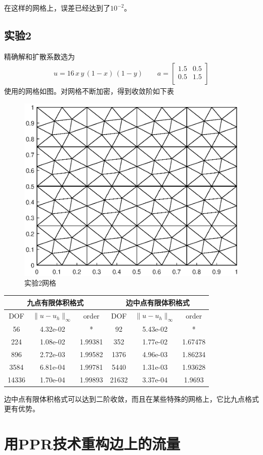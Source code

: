 \documentclass[12pt,a4paper]{article}
\theoremstyle{plain}
\begin{document}
在这样的网格上，误差已经达到了$10^{-2}$。

\subsection*{实验2}

精确解和扩散系数选为
\begin{align*}
u = 16 \, x \, y \, (1-x) \, (1-y) \qquad
a = \left[
\begin{matrix}
1.5 & 0.5 \\
0.5 & 1.5 \\
\end{matrix}
\right]
\end{align*}
使用的网格如图。对网格不断加密，得到收敛阶如下表
\begin{figure}[H]
\centering
\includegraphics[width=0.4\linewidth]{mesh2}
\caption{实验2网格}
\end{figure}

\begin{table}
\centering
\begin{tabular}{ccc|ccc}
\multicolumn{3}{c}{九点有限体积格式}  & \multicolumn{3}{c}{边中点有限体积格式} \\
\hline
DOF & $\|u - u_h\|_{\infty}$ & order & DOF & $\|u - u_h\|_{\infty}$ & order \\
\hline
56 & 4.32e-02 & * & 92 & 5.43e-02 & * \\
224 & 1.08e-02 & 1.99381 & 352 & 1.77e-02 & 1.67478 \\
896 & 2.72e-03 & 1.99582 & 1376 & 4.96e-03 & 1.86234 \\
3584 & 6.81e-04 & 1.99781 & 5440 & 1.31e-03 & 1.93628 \\
14336 & 1.70e-04 & 1.99893 & 21632 & 3.37e-04 & 1.9693 \\
\hline
\end{tabular}
\end{table}

边中点有限体积格式可以达到二阶收敛，而且在某些特殊的网格上，它比九点格式更有优势。

\newpage
\section*{用PPR技术重构边上的流量}
\end{document}
